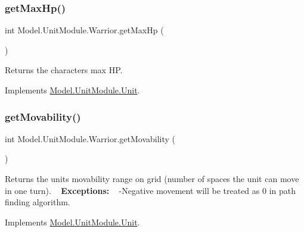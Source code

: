 \hypertarget{class_model_1_1_unit_module_1_1_warrior_a1f8dded5d374af5e7e2f68a6977a19c3}{}\label{class_model_1_1_unit_module_1_1_warrior_a1f8dded5d374af5e7e2f68a6977a19c3} 
\subsubsection{\texorpdfstring{get\+Max\+Hp()}{getMaxHp()}}
{\footnotesize\ttfamily int Model.\+Unit\+Module.\+Warrior.\+get\+Max\+Hp (\begin{DoxyParamCaption}{ }\end{DoxyParamCaption})\hspace{0.3cm}{\ttfamily [inline]}}

Returns the character\textquotesingle{}s max HP. 

Implements \hyperlink{interface_model_1_1_unit_module_1_1_unit_adee907637c0ce8487149ae4549fb4cf1}{Model.\+Unit\+Module.\+Unit}.

\hypertarget{class_model_1_1_unit_module_1_1_warrior_a2c9d4bae73598731bd6378add6a377e7}{}\label{class_model_1_1_unit_module_1_1_warrior_a2c9d4bae73598731bd6378add6a377e7} 
\subsubsection{\texorpdfstring{get\+Movability()}{getMovability()}}
{\footnotesize\ttfamily int Model.\+Unit\+Module.\+Warrior.\+get\+Movability (\begin{DoxyParamCaption}{ }\end{DoxyParamCaption})\hspace{0.3cm}{\ttfamily [inline]}}

Returns the unit\textquotesingle{}s movability range on grid (number of spaces the unit can move in one turn). ~\newline
{\bfseries Exceptions\+:} ~\newline
 -\/\+Negative movement will be treated as 0 in path finding algorithm. 

Implements \hyperlink{interface_model_1_1_unit_module_1_1_unit_a670aae31f46980c871774352f5fe3a3f}{Model.\+Unit\+Module.\+Unit}.

